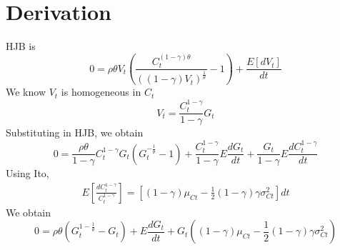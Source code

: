 \documentclass[english]{article}
\begin{document}
\section{Derivation}
HJB is
$$0 = \rho \theta V_t(\frac{C_t^{(1-\gamma)\theta}}{((1-\gamma)V_t)^{\frac{1}{\theta}}}-1) + \frac{E[dV_t]}{dt}$$
We know $V_t$ is homogeneous in  $C_t$
$$V_t = \frac{C_t^{1-\gamma}}{1-\gamma} G_t$$
Substituting in HJB, we obtain
$$0 = \frac{\rho\theta}{1-\gamma}C_t^{1-\gamma}G_t(G_t^{-\frac{1}{\theta}}-1) + \frac{C_t^{1-\gamma}}{1-\gamma}E\frac{dG_t}{dt} +  \frac{G_t}{1-\gamma}E\frac{dC_t^{1-\gamma}}{dt}$$
Using Ito, 
\begin{align*}
	E[\frac{dC_{t}^{1-\gamma}}{C_{t}^{1-\gamma}}]=\left[(1-\gamma)\mu_{Ct}-\frac{1}{2}(1-\gamma)\gamma\sigma^{2}_{Ct}\right]dt
\end{align*}
We obtain 
$$0 = \rho \theta (G_t^{1-\frac{1}{\theta}}-G_t) + E\frac{dG_t}{dt} + G_t ((1-\gamma) \mu_{Ct} - \frac{1}{2}(1-\gamma)\gamma\sigma_{Ct}^2)$$
\end{document}
